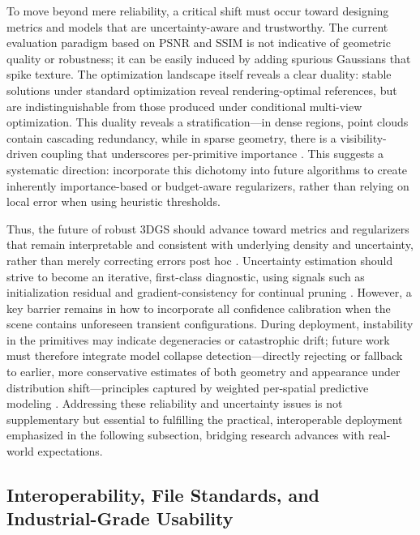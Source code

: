 \documentclass[11pt,a4paper]{article}
\begin{document}
To move beyond mere reliability, a critical shift must occur toward designing metrics and models that are uncertainty-aware and trustworthy. The current evaluation paradigm based on PSNR and SSIM is not indicative of geometric quality or robustness; it can be easily induced by adding spurious Gaussians that spike texture. The optimization landscape itself reveals a clear duality: stable solutions under standard optimization reveal rendering-optimal references, but are indistinguishable from those produced under conditional multi-view optimization. This duality reveals a stratification---in dense regions, point clouds contain cascading redundancy, while in sparse geometry, there is a visibility-driven coupling that underscores per-primitive importance \cite{arxiv:2602.08909v1}. This suggests a systematic direction: incorporate this dichotomy into future algorithms to create inherently importance-based or budget-aware regularizers, rather than relying on local error when using heuristic thresholds.

Thus, the future of robust 3DGS should advance toward metrics and regularizers that remain interpretable and consistent with underlying density and uncertainty, rather than merely correcting errors post hoc \cite{arxiv:2510.26921v1,arxiv:2506.12400v2}. Uncertainty estimation should strive to become an iterative, first-class diagnostic, using signals such as initialization residual and gradient-consistency for continual pruning \cite{arxiv:2605.14880v1,arxiv:2211.05105v4}. However, a key barrier remains in how to incorporate all confidence calibration when the scene contains unforeseen transient configurations. During deployment, instability in the primitives may indicate degeneracies or catastrophic drift; future work must therefore integrate model collapse detection---directly rejecting or fallback to earlier, more conservative estimates of both geometry and appearance under distribution shift---principles captured by weighted per-spatial predictive modeling \cite{arxiv:2602.19753v1,arxiv:2507.05426v1}. Addressing these reliability and uncertainty issues is not supplementary but essential to fulfilling the practical, interoperable deployment emphasized in the following subsection, bridging research advances with real-world expectations.


\subsection{Interoperability, File Standards, and Industrial-Grade Usability}
\end{document}
